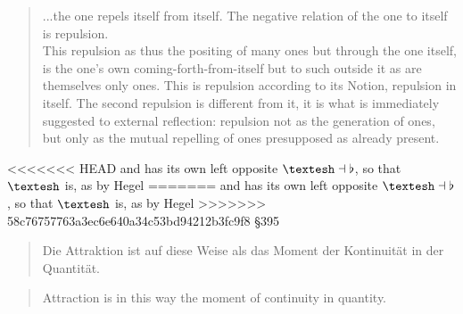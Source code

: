 \documentclass{article}
\begin{document}
\begin{quote}
    ...the one repels itself from itself. The negative relation of the one to itself is repulsion.\\
    
    This repulsion as thus the positing of many ones but through the one itself, is the one’s own coming-forth-from-itself
but to such outside it as are themselves only ones. This is repulsion according to its Notion, repulsion
in itself. The second repulsion is different from it, it is what is immediately suggested to external
reflection: repulsion not as the generation of ones, but only as the mutual repelling of ones presupposed
as already present.
\end{quote}

<<<<<<< HEAD
and has its own left opposite $\textrm{\textesh}\dashv\flat$, so that $\textrm{\textesh}$ is, as by Hegel 
=======
and has its own left opposite $\textrm{\textesh}\dashv\flat$, so that $\textrm{\textesh}$ is, as by Hegel
>>>>>>> 58c76757763a3ec6e640a34c53bd94212b3fc9f8
§395

\begin{quote}
    Die Attraktion ist auf diese Weise als das Moment der Kontinuität in der Quantität.
\end{quote}

\begin{quote}
    Attraction is in this way the moment of continuity in quantity.
\end{quote}
\end{document}

